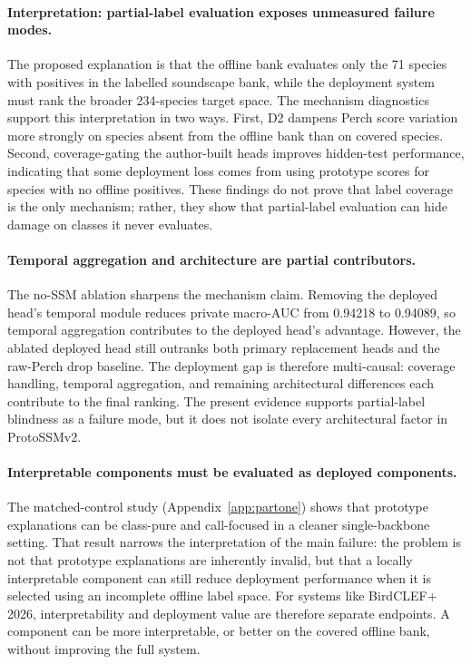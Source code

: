 \documentclass{ceurart}
\begin{document}
\paragraph{Interpretation: partial-label evaluation exposes unmeasured failure modes.}
The proposed explanation is that the offline bank evaluates only the 71 species with positives in the labelled soundscape bank, while the deployment system must rank the broader 234-species target space.
The mechanism diagnostics support this interpretation in two ways.
First, D2 dampens Perch score variation more strongly on species absent from the offline bank than on covered species.
Second, coverage-gating the author-built heads improves hidden-test performance, indicating that some deployment loss comes from using prototype scores for species with no offline positives.
These findings do not prove that label coverage is the only mechanism; rather, they show that partial-label evaluation can hide damage on classes it never evaluates.

\paragraph{Temporal aggregation and architecture are partial contributors.}
The no-SSM ablation sharpens the mechanism claim.
Removing the deployed head's temporal module reduces private macro-AUC from 0.94218 to 0.94089, so temporal aggregation contributes to the deployed head's advantage.
However, the ablated deployed head still outranks both primary replacement heads and the raw-Perch drop baseline.
The deployment gap is therefore multi-causal: coverage handling, temporal aggregation, and remaining architectural differences each contribute to the final ranking.
The present evidence supports partial-label blindness as a failure mode, but it does not isolate every architectural factor in ProtoSSMv2.

\paragraph{Interpretable components must be evaluated as deployed components.}
The matched-control study (Appendix~\ref{app:partone}) shows that prototype explanations can be class-pure and call-focused in a cleaner single-backbone setting.
That result narrows the interpretation of the main failure: the problem is not that prototype explanations are inherently invalid, but that a locally interpretable component can still reduce deployment performance when it is selected using an incomplete offline label space.
For systems like BirdCLEF+ 2026, interpretability and deployment value are therefore separate endpoints.
A component can be more interpretable, or better on the covered offline bank, without improving the full system.
\end{document}
